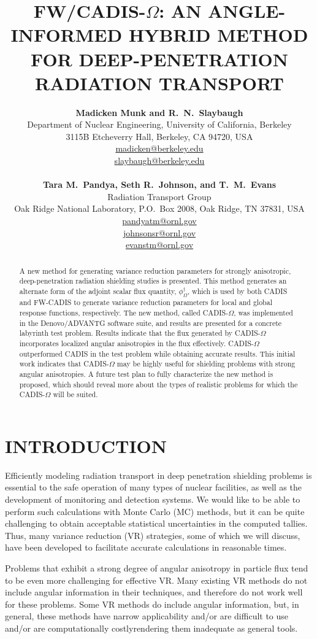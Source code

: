 \documentclass[12pt]{article}
\title{FW/CADIS-$\Omega$: AN ANGLE-INFORMED HYBRID METHOD FOR DEEP-PENETRATION RADIATION TRANSPORT}
\author{ 
  \textbf{Madicken Munk and R.~N.~Slaybaugh} \\
  Department of Nuclear Engineering, University of California, Berkeley \\
  3115B Etcheverry Hall, Berkeley, CA 94720, USA\\
  \href{mailto:madicken@berkeley.edu}{madicken@berkeley.edu}\\
  \href{mailto:slaybaugh@berkeley.edu}{slaybaugh@berkeley.edu}\\
  \\
  \textbf{Tara M.~Pandya, Seth R.~Johnson, and T.~M.~Evans}\\
  Radiation Transport Group\\
  Oak Ridge National Laboratory, P.O.\ Box 2008, Oak Ridge, TN 37831, USA\\
  \href{mailto:pandyatm@ornl.gov}{pandyatm@ornl.gov}\\
  \href{mailto:johnsonsr@ornl.gov}{johnsonsr@ornl.gov}\\
  \href{mailto:evanstm@ornl.gov}{evanstm@ornl.gov}
  }
\begin{document}
\maketitle

\begin{abstract}
A new method for generating variance reduction parameters for strongly anisotropic, deep-penetration radiation shielding studies is presented. This method generates an alternate form of the adjoint scalar flux quantity, $\phi^{\dagger}_{\Omega}$, which is used by both CADIS and FW-CADIS to generate variance reduction parameters for local and global response functions, respectively. The new method, called CADIS-$\Omega$, was implemented in the Denovo/ADVANTG software suite, and results are presented for a concrete labyrinth test problem. Results indicate that the flux generated by CADIS-$\Omega$ incorporates localized angular anisotropies in the flux effectively. CADIS-$\Omega$ outperformed CADIS in the test problem while obtaining accurate results. This initial work indicates that CADIS-$\Omega$ may be highly useful for shielding problems with strong angular anisotropies. A future test plan to fully characterize the new method is proposed, which should reveal more about the types of realistic problems for which the CADIS-$\Omega$ will be suited. 
\end{abstract}


\section{INTRODUCTION}
\label{sect::intro}

Efficiently modeling radiation transport in deep penetration shielding problems is essential to the safe operation of many types of nuclear facilities, as well as the development of monitoring and detection systems. We would like to be able to perform such calculations with Monte Carlo (MC) methods, but it can be quite challenging to obtain acceptable statistical uncertainties in the computed tallies. Thus, many variance reduction (VR) strategies, some of which we will discuss, have been developed to facilitate accurate calculations in reasonable times. 

Problems that exhibit a strong degree of angular anisotropy in particle flux tend to be even more challenging for effective VR.
Many existing VR methods do not include angular information in their techniques, and therefore do not work well for these problems.  
Some VR methods do include angular information, but, in general, these methods have narrow applicability and/or are difficult to use and/or are computationally costly\textemdash rendering them inadequate as general tools.
\end{document}
